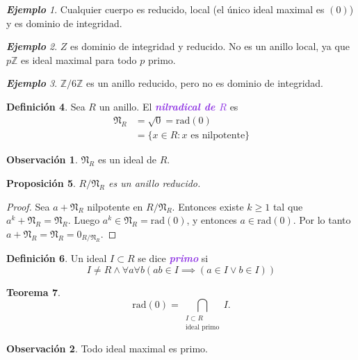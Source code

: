 \documentclass{article}
\newtheorem{theorem}{Teorema}[subsection]
\newtheorem{proposition}[theorem]{Proposición}
\theoremstyle{definition}
\newtheorem{definition}[theorem]{Definición}
\newtheorem*{obs}{Observación}
\theoremstyle{remark}
\newtheorem{example}[theorem]{\textbf{Ejemplo}}
\numberwithin{equation}{section}
\newcommand{\Z}{\mathbb{Z}}
\newcommand{\Nfrak}{\mathfrak{N}}
\newcommand{\rad}{\mathrm{rad}}
\newcommand{\br}[1]{\left( #1 \right)}
\newcommand{\zmz}[1]{\Z/ #1 \Z}
\newcommand{\wea}[1]{\textcolor{BlueViolet}{\textbf{\emph{#1}}}}
\begin{document}
\begin{example}
  Cualquier cuerpo es reducido, local (el único ideal maximal es $(0)$) y es dominio de integridad.
\end{example}

\begin{example}
  $Z$ es dominio de integridad y reducido. No es un anillo local, ya que $p\Z$ es ideal maximal para todo $p$ primo.
\end{example}

\begin{example}
  $\zmz 6$ es un anillo reducido, pero no es dominio de integridad.
\end{example}

\begin{definition}
  Sea $R$ un anillo. El \wea{nilradical de $R$} es 
  \begin{align*}
      \Nfrak_R &= \sqrt{0} = \rad(0) \\
      &= \{x \in R \colon x \text{ es nilpotente}\}
  \end{align*}
\end{definition}

\begin{obs}
  $\Nfrak_R$ es un ideal de $R$.
\end{obs}

\begin{proposition}
  $R/\Nfrak_R$ es un anillo reducido.
\end{proposition}
\begin{proof}
  Sea $a + \Nfrak_R$ nilpotente en $R/\Nfrak_R$. Entonces existe $k \geq 1$ tal que $a^k + \Nfrak_R = \Nfrak_R$. Luego $a^k \in \Nfrak_R = \rad(0)$, y entonces $a \in \rad(0)$. Por lo tanto $a + \Nfrak_R = \Nfrak_R = 0_{R/\Nfrak_R}$.
\end{proof}

\begin{definition}
  Un ideal $I \subset R$ se dice \wea{primo} si 
  \[ I \neq R \land \forall a \forall b \br{ab \in I \implies (a \in I \lor b \in I)} \]
\end{definition}

\begin{theorem}
  $$\rad(0) = \bigcap_{\substack{I \subset R \\ \text{ideal primo}}} I.$$
\end{theorem}

\begin{obs}
  Todo ideal maximal es primo.
\end{obs}
\end{document}
